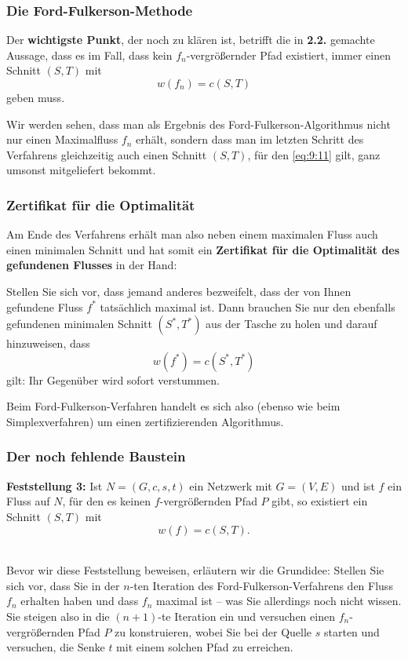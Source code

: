 \documentclass[smaller]{beamer}
\begin{document}
\begin{frame}
 \frametitle{Die Ford-Fulkerson-Methode}
 Der \textbf{wichtigste Punkt}, der noch zu klären ist, betrifft die in \textbf{2.2.} gemachte Aussage, dass es im Fall, dass kein $f_n$-vergrößernder Pfad existiert, immer einen Schnitt $(S,T)$ mit
\begin{equation}
\label{eq:9:11}
w(f_n) = c(S,T)
\end{equation}
geben muss. \\ \vspace*{0.2cm}

Wir werden sehen, dass man als Ergebnis des Ford-Fulkerson-Algorithmus nicht nur einen Maximalfluss $f_n$ erhält, sondern \alert{dass man im letzten Schritt des Verfahrens gleichzeitig auch einen Schnitt $(S,T)$, für den \eqref{eq:9:11} gilt, ganz umsonst mitgeliefert bekommt}.
\end{frame}

\begin{frame}
 \frametitle{Zertifikat für die Optimalität}
 Am Ende des Verfahrens erhält man also neben einem maximalen Fluss auch einen minimalen Schnitt \alert{und hat somit ein \textbf{Zertifikat für die Optimalität des gefundenen Flusses} in der Hand}: \\ \vspace*{0.2cm}
 
 Stellen Sie sich vor, dass jemand anderes bezweifelt, dass der von Ihnen gefundene Fluss $f^*$ tatsächlich maximal ist. Dann brauchen Sie nur den ebenfalls gefundenen minimalen Schnitt $(S^*,T^*)$ aus der Tasche zu holen und darauf hinzuweisen, dass
\[ 
w(f^*) = c(S^*,T^*)
\]
gilt: Ihr Gegenüber wird sofort verstummen. \\ \vspace*{0.2cm}

Beim Ford-Fulkerson-Verfahren handelt es sich also (ebenso wie beim Simplexverfahren) um einen \alert{zertifizierenden Algorithmus}.
\end{frame}

\begin{frame}
 \frametitle{Der noch fehlende Baustein}
 \textbf{Feststellung 3:} Ist $N = (G,c,s,t)$ ein Netzwerk mit $G=(V,E)$ und ist $f$ ein Fluss auf $N$, für den es keinen $f$-vergrößernden Pfad $P$ gibt, so existiert ein Schnitt $(S,T)$ mit $$w(f) = c(S,T).$$ \\ \vspace*{0.2cm}

Bevor wir diese Feststellung beweisen, erläutern wir die \alert{Grundidee}: Stellen Sie sich vor, dass Sie in der $n$-ten Iteration des Ford-Fulkerson-Verfahrens den Fluss $f_n$ erhalten haben und dass $f_n$ maximal ist -- was Sie allerdings noch nicht wissen. Sie steigen also in die $(n+1)$-te Iteration ein und versuchen einen $f_n$-vergrößernden Pfad $P$ zu konstruieren, wobei Sie bei der Quelle $s$ starten und versuchen, die Senke $t$ mit einem solchen Pfad zu erreichen. 
\end{frame}
\end{document}
